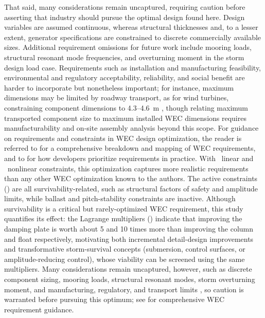     That said, many considerations remain uncaptured, requiring caution before asserting that industry should pursue the optimal design found here.
    Design variables are assumed continuous, whereas structural thicknesses and, to a lesser extent, generator specifications are constrained to discrete commercially available sizes.
    Additional requirement omissions for future work include mooring loads, structural resonant mode frequencies, and overturning moment in the storm design load case.
    Requirements such as installation and manufacturing feasibility, environmental and regulatory acceptability, reliability, and social benefit are harder to incorporate but nonetheless important;
    for instance, maximum dimensions may be limited by roadway transport, as for wind turbines, constraining component dimensions to 4.3--4.6~m \cite{cotrell_analysis_2014}, though relating maximum transported component size to maximum installed WEC dimensions requires manufacturability and on-site assembly analysis beyond this scope.
    For guidance on requirements and constraints in WEC design optimization, the reader is referred to \cite{bull_systems_2017,babarit_stakeholder_2017} for a comprehensive breakdown and mapping of WEC requirements, and to \cite{trueworthy_wave_2020} for how developers prioritize requirements in practice.
\else
    With \resultsRE[numLinConstraints]~linear and \resultsRE[numNonlinConstraints]~nonlinear constraints, this optimization captures more realistic requirements than any other WEC optimization known to the authors.
    The active constraints () are all survivability-related, such as structural factors of safety and amplitude limits, while ballast and pitch-stability constraints are inactive.
    Although survivability is a critical but rarely-optimized WEC requirement, this study quantifies its effect:
    the Lagrange multipliers () indicate that improving the damping plate is worth about 5 and 10 times more than improving the column and float respectively,
    motivating both incremental detail-design improvements and transformative storm-survival concepts (submersion, control surfaces, or amplitude-reducing control), whose viability can be screened using the same multipliers.
    Many considerations remain uncaptured, however, such as discrete component sizing, mooring loads, structural resonant modes, storm overturning moment, and manufacturing, regulatory, and transport limits \cite{cotrell_analysis_2014}, so caution is warranted before pursuing this optimum; see \cite{bull_systems_2017,babarit_stakeholder_2017,trueworthy_wave_2020} for comprehensive WEC requirement guidance.
\fi


